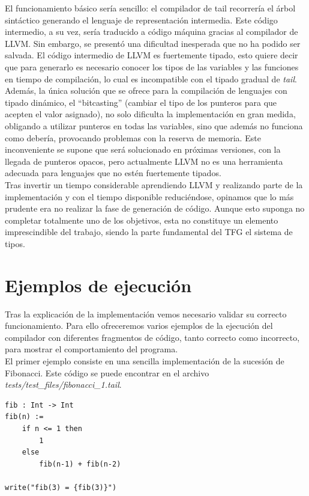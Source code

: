 El funcionamiento básico sería sencillo: el compilador de tail recorrería el árbol sintáctico generando el lenguaje de representación intermedia. Este código intermedio, a su vez, sería traducido a código máquina gracias al compilador de LLVM. Sin embargo, se presentó una dificultad inesperada que no ha podido ser salvada. El código intermedio de LLVM es fuertemente tipado, esto quiere decir que para generarlo es necesario conocer los tipos de las variables y las funciones en tiempo de compilación, lo cual es incompatible con el tipado gradual de \textit{tail}. Además, la única solución que se ofrece para la compilación de lenguajes con tipado dinámico, el ``bitcasting'' (cambiar el tipo de los punteros para que acepten el valor asignado), no solo dificulta la implementación en gran medida, obligando a utilizar punteros en todas las variables, sino que además no funciona como debería, provocando problemas con la reserva de memoria. Este inconveniente se supone que será solucionado en próximas versiones, con la llegada de punteros opacos, pero actualmente LLVM no es una herramienta adecuada para lenguajes que no estén fuertemente tipados.\\

Tras invertir un tiempo considerable aprendiendo LLVM y realizando parte de la implementación y con el tiempo disponible reduciéndose, opinamos que lo más prudente era no realizar la fase de generación de código. Aunque esto suponga no completar totalmente uno de los objetivos, esta no constituye un elemento imprescindible del trabajo, siendo la parte fundamental del TFG el sistema de tipos.\\


\section{Ejemplos de ejecución}
Tras la explicación de la implementación vemos necesario validar su correcto funcionamiento. Para ello ofreceremos varios ejemplos de la ejecución del compilador con diferentes fragmentos de código, tanto correcto como incorrecto, para mostrar el comportamiento del programa.\\

El primer ejemplo consiste en una sencilla implementación de la sucesión de Fibonacci. Este código se puede encontrar en el archivo \textit{tests/test\_files/fibonacci\_1.tail}.\\
\newpage

\begin{lstlisting}[style=tail]
fib : Int -> Int
fib(n) :=
	if n <= 1 then
		1
	else
		fib(n-1) + fib(n-2)

write("fib(3) = {fib(3)}")
\end{lstlisting}

